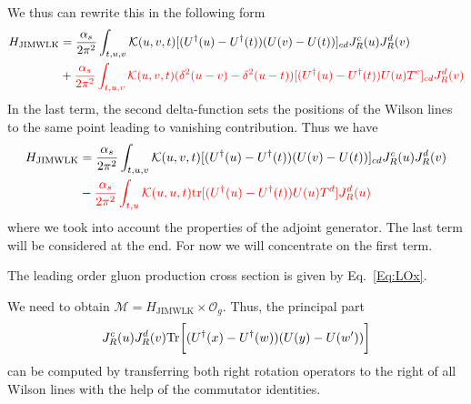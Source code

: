 \documentclass[aps,prd,amsmath,amssymb,nofootinbib]{revtex4-2}
\numberwithin{equation}{section}
\begin{document}
We thus can rewrite this in the following form 
\begin{align}
\label{Eq:HLOComm}
H_{\text{JIMWLK}} &= \frac{\alpha_s}{2 \pi^2} \int_{t,u,v} 
{\cal K}(u, v, t)
[ (U^\dagger(u)  - U^\dagger(t)) (U(v)  - U(t) ) ]_{cd}
J_R ^c(u)
J_R ^d(v)
\nonumber \\ &+ {\color{red}
\frac{\alpha_s}{2 \pi^2} \int_{t,u,v} 
{\cal K}(u, v, t)
(\delta^2(u-v) - \delta^2(u-t))
[ (U^\dagger(u)  - U^\dagger(t)) U(u) T^c  ]_{cd}
J_R ^d(v) } 
\end{align}
In the last term,  the second delta-function sets the positions of the Wilson lines to the same point leading to vanishing contribution. Thus we have 
\begin{align}
\label{Eq:HLOfinal}
H_{\text{JIMWLK}} &= \frac{\alpha_s}{2 \pi^2} \int_{t,u,v} 
{\cal K}(u, v, t)
[ (U^\dagger(u)  - U^\dagger(t)) (U(v)  - U(t) ) ]_{cd}
J_R ^c(u)
J_R ^d(v)
\nonumber \\ &-  {\color{red}
\frac{\alpha_s}{2 \pi^2} \int_{t,u} 
{\cal K}(u, u, t)
{\rm tr}[ (U^\dagger(u)  - U^\dagger(t)) U(u) T^d  ]
J_R ^d(u) } 
\end{align}
where we took into account the properties of the adjoint generator. 
The last term  will be  considered at the end. For now we will concentrate on the first term. 

The leading order gluon production cross section is given by Eq.~\eqref{Eq:LOx}.


We need to obtain $\mathcal{M} = H_{\text{JIMWLK}}\times \mathcal{O}_{g}$. Thus, the principal part
\begin{equation}
    J_R^c(u) J_R^d(v) {\rm Tr}  \bigg[( U^\dagger(x) - U^\dagger(w) )( U(y) - U(w') )\bigg] 
\end{equation}
can be computed by transferring both right rotation operators to the right of all Wilson lines with the help of the commutator identities. 
\end{document}
